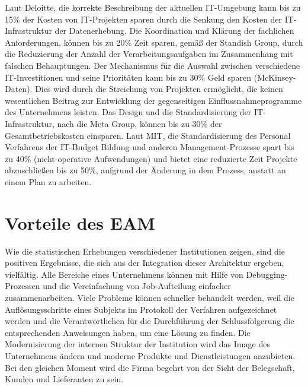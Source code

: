 \documentclass[
	A4paper,
	DIV=9,
	BCOR7mm,
	smallheadings,
	headinclude,
	footinclude,
	headsepline,
	parindent,
	german,
	captions=tableheading,
	abstracton
	]{scrreprt}
\begin{document}
Laut Deloitte, die  korrekte Beschreibung der aktuellen IT-Umgebung kann bis zu 15\% der Kosten von IT-Projekten sparen durch  die Senkung den Kosten der IT-Infrastruktur der Datenerhebung. Die Koordination und Klärung der fachlichen Anforderungen, können bis zu 20\%  Zeit  sparen, gemäß der Standish Group, durch die Reduzierung der Anzahl der Verarbeitungsaufgaben im Zusammenhang mit falschen Behauptungen. Der Mechanismus für die Auswahl zwischen verschiedene  IT-Investitionen und seine  Prioritäten  kann bis zu 30\% Geld sparen (McKinsey-Daten). Dies wird durch die Streichung von Projekten ermöglicht, die keinen wesentlichen Beitrag zur Entwicklung der gegenseitigen Einflussnahmeprogramme des Unternehmens leisten. Das Design und die Standardisierung der IT-Infrastruktur, nach die Meta Group, können bis zu 30\% der Gesamtbetriebskosten einsparen. Laut MIT, die Standardisierung des Personal Verfahrens der IT-Budget Bildung und anderen Management-Prozesse spart bis zu 40\% (nicht-operative Aufwendungen) und bietet eine reduzierte Zeit Projekte abzuschließen bis zu 50\%, aufgrund der Änderung in dem Prozess, anstatt an einem Plan zu arbeiten.

\section{Vorteile des EAM}
Wie die statistischen Erhebungen verschiedener Institutionen zeigen, sind die positiven Ergebnisse, die sich aus der Integration dieser Architektur ergeben, vielfältig. Alle Bereiche eines Unternehmens können mit Hilfe von Debugging-Prozessen und die Vereinfachung von Job-Aufteilung einfacher zusammenarbeiten. Viele Probleme können schneller behandelt werden, weil die Auflösungsschritte eines Subjekts im Protokoll der Verfahren aufgezeichnet werden und die Verantwortlichen für die Durchführung der Schlussfolgerung die entsprechenden Anweisungen haben, um eine Lösung zu finden. Die Modernisierung der internen Struktur der Institution wird das Image des Unternehmens ändern und moderne Produkte und Dienstleistungen anzubieten. Bei den gleichen Moment wird die Firma begehrt von der Sicht der Belegschaft, Kunden und Lieferanten zu sein.
\end{document}
